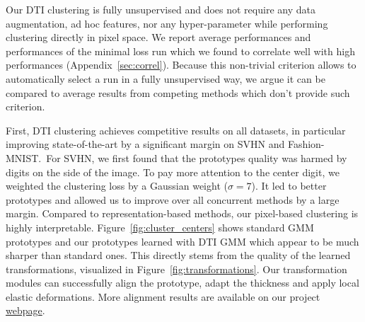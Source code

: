 \documentclass{article}
\begin{document}
\vspace{-0.3em}
Our DTI clustering is fully unsupervised and does not require any data augmentation, ad hoc 
features, nor any hyper-parameter while performing clustering directly in pixel space.  We 
report average performances and performances of the minimal loss run which we found to 
correlate well with high performances (Appendix~\ref{sec:correl}). Because this non-trivial 
criterion allows to automatically select a run in a fully unsupervised way, we argue it can 
be compared to average results from competing methods which don't provide such criterion.
 
\vspace{-0.3em}
First, DTI clustering achieves competitive results on all datasets, in particular improving
state-of-the-art by a significant margin on SVHN and Fashion-MNIST.\ For SVHN, we first found 
that the prototypes quality was harmed by digits on the side of the image. To pay more 
attention to the center digit, we weighted the clustering loss by a Gaussian weight 
($\sigma=7$). It led to better prototypes and allowed us to improve over all concurrent 
methods by a large margin. Compared to representation-based methods, our pixel-based 
clustering is highly interpretable.  Figure~\ref{fig:cluster_centers} shows standard GMM 
prototypes and our prototypes learned with DTI GMM which appear to be much sharper than 
standard ones. This directly stems from the quality of the learned transformations, 
visualized in Figure~\ref{fig:transformations}.  Our transformation modules can successfully 
align the prototype, adapt the thickness and apply local elastic deformations. More alignment 
results are available on our project 
\href{http://imagine.enpc.fr/~monniert/DTIClustering/}{webpage}.
\end{document}
